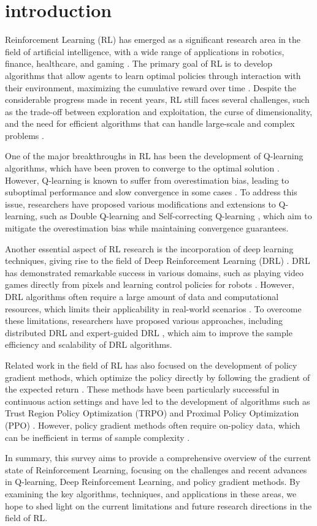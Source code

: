 \section{introduction}
Reinforcement Learning (RL) has emerged as a significant research area in the field of artificial intelligence, with a wide range of applications in robotics, finance, healthcare, and gaming \cite{2108.11510}. The primary goal of RL is to develop algorithms that allow agents to learn optimal policies through interaction with their environment, maximizing the cumulative reward over time \cite{1708.05866}. Despite the considerable progress made in recent years, RL still faces several challenges, such as the trade-off between exploration and exploitation, the curse of dimensionality, and the need for efficient algorithms that can handle large-scale and complex problems \cite{1906.10025}.

One of the major breakthroughs in RL has been the development of Q-learning algorithms, which have been proven to converge to the optimal solution \cite{2303.08631}. However, Q-learning is known to suffer from overestimation bias, leading to suboptimal performance and slow convergence in some cases \cite{2106.14642}. To address this issue, researchers have proposed various modifications and extensions to Q-learning, such as Double Q-learning \cite{1511.02377} and Self-correcting Q-learning \cite{2012.01100}, which aim to mitigate the overestimation bias while maintaining convergence guarantees.

Another essential aspect of RL research is the incorporation of deep learning techniques, giving rise to the field of Deep Reinforcement Learning (DRL) \cite{1709.05067}. DRL has demonstrated remarkable success in various domains, such as playing video games directly from pixels and learning control policies for robots \cite{1708.05866}. However, DRL algorithms often require a large amount of data and computational resources, which limits their applicability in real-world scenarios \cite{1906.10025}. To overcome these limitations, researchers have proposed various approaches, including distributed DRL \cite{2212.00253} and expert-guided DRL \cite{2106.14642}, which aim to improve the sample efficiency and scalability of DRL algorithms.

Related work in the field of RL has also focused on the development of policy gradient methods, which optimize the policy directly by following the gradient of the expected return \cite{1811.09013}. These methods have been particularly successful in continuous action settings and have led to the development of algorithms such as Trust Region Policy Optimization (TRPO) and Proximal Policy Optimization (PPO) \cite{2209.01820}. However, policy gradient methods often require on-policy data, which can be inefficient in terms of sample complexity \cite{1911.04817}.

In summary, this survey aims to provide a comprehensive overview of the current state of Reinforcement Learning, focusing on the challenges and recent advances in Q-learning, Deep Reinforcement Learning, and policy gradient methods. By examining the key algorithms, techniques, and applications in these areas, we hope to shed light on the current limitations and future research directions in the field of RL.